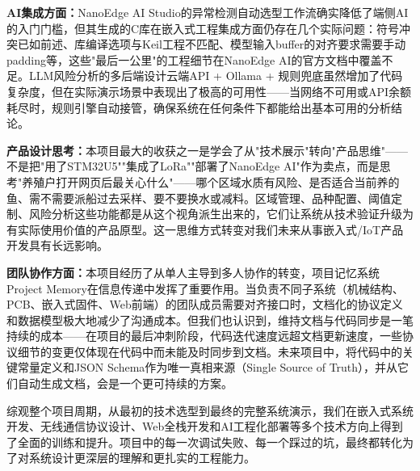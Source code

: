 \documentclass[12pt,a4paper]{ctexart}
\begin{document}
\textbf{AI集成方面：}NanoEdge AI Studio的异常检测自动选型工作流确实降低了端侧AI的入门门槛，但其生成的C库在嵌入式工程集成方面仍存在几个实际问题：符号冲突已如前述、库编译选项与Keil工程不匹配、模型输入buffer的对齐要求需要手动padding等，这些"最后一公里"的工程细节在NanoEdge AI的官方文档中覆盖不足。LLM风险分析的多后端设计云端API + Ollama + 规则兜底虽然增加了代码复杂度，但在实际演示场景中表现出了极高的可用性——当网络不可用或API余额耗尽时，规则引擎自动接管，确保系统在任何条件下都能给出基本可用的分析结论。

\textbf{产品设计思考：}本项目最大的收获之一是学会了从"技术展示"转向"产品思维"——不是把"用了STM32U5""集成了LoRa""部署了NanoEdge AI"作为卖点，而是思考"养殖户打开网页后最关心什么"——哪个区域水质有风险、是否适合当前养的鱼、需不需要派船过去采样、要不要换水或减料。区域管理、品种配置、阈值定制、风险分析这些功能都是从这个视角派生出来的，它们让系统从技术验证升级为有实际使用价值的产品原型。这一思维方式转变对我们未来从事嵌入式/IoT产品开发具有长远影响。

\textbf{团队协作方面：}本项目经历了从单人主导到多人协作的转变，项目记忆系统Project Memory在信息传递中发挥了重要作用。当负责不同子系统（机械结构、PCB、嵌入式固件、Web前端）的团队成员需要对齐接口时，文档化的协议定义和数据模型极大地减少了沟通成本。但我们也认识到，维持文档与代码同步是一笔持续的成本——在项目的最后冲刺阶段，代码迭代速度远超文档更新速度，一些协议细节的变更仅体现在代码中而未能及时同步到文档。未来项目中，将代码中的关键常量定义和JSON Schema作为唯一真相来源（Single Source of Truth），并从它们自动生成文档，会是一个更可持续的方案。

综观整个项目周期，从最初的技术选型到最终的完整系统演示，我们在嵌入式系统开发、无线通信协议设计、Web全栈开发和AI工程化部署等多个技术方向上得到了全面的训练和提升。项目中的每一次调试失败、每一个踩过的坑，最终都转化为了对系统设计更深层的理解和更扎实的工程能力。
\end{document}

